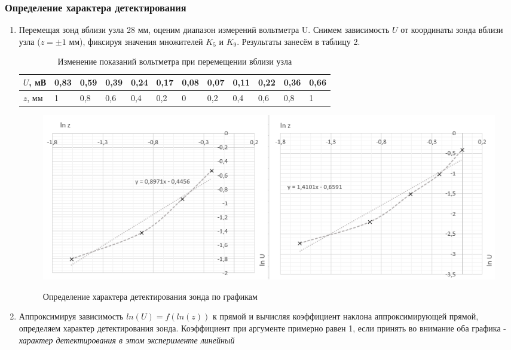 \documentclass[a4paper]{article}
\begin{document}
\subsubsection{Определение характера детектирования}
\begin{enumerate}
    \item Перемещая зонд вблизи узла 28 мм, оценим диапазон измерений вольтметра U. Снимем зависимость $U$ от координаты зонда вблизи узла ($z = \pm 1$ мм), фиксируя значения множителей $K_5$ и $K_9$. Результаты занесём в таблицу 2.
    
    \begin{table}[h]
    \centering
    \begin{center}
    \caption{Изменение показаний вольтметра при перемещении вблизи узла}
    \end{center}
    \vspace{0.1cm}
    \label{tab:my_label}
    \begin{tabular}{ |p{1.5cm}||p{0.5cm}|p{0.5cm}|p{0.5cm}|p{0.5cm}|p{0.5cm}|p{0.5cm}|p{0.5cm}|p{0.5cm}|p{0.5cm}|p{0.5cm}|p{0.5cm}|  }
 \hline
 $U$, мВ & 0,83 & 0,59 & 0,39 & 0,24 & 0,17 & 0,08 & 0,07 & 0,11 & 0,22 & 0,36 & 0,66   \\
\hline 
 $z$, мм & 1 & 0,8 & 0,6 & 0,4 & 0,2 & 0 & 0,2 & 0,4 & 0,6 & 0,8 & 1 \\
 \hline
\end{tabular}
\end{table}
    
    \begin{figure}[h]
    \centering
    \caption{Определение характера детектирования зонда по графикам}
    \includegraphics[width=\textwidth]{graph4.PNG}
    \label{fig:vac}
\end{figure}

    \item Аппроксимируя зависимость $ln(U) = f(ln(z))$ к прямой и вычисляя коэффициент наклона аппроксимирующей прямой, определяем характер детектирования зонда. Коэффициент при аргументе примерно равен 1, если принять во внимание оба графика - \textit{характер детектирования в этом эксперименте линейный}
\end{enumerate}
\end{document}

